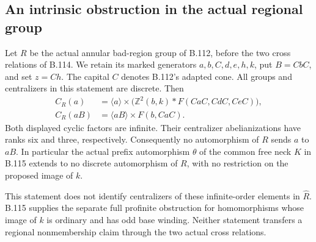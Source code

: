 \subsection*{An intrinsic obstruction in the actual regional group}

\label{stmt:B116}
Let $R$ be the actual annular bad-region group of B.112, before the
two cross relations of B.114. We retain its marked generators
$a,b,C,d,e,h,k$, put $B=CbC$, and set $z=Ch$.
The capital $C$ denotes B.112's adapted cone.
All groups and centralizers in this statement are discrete. Then
\begin{align}
 C_R(a)&=\langle a\rangle\times
   \bigl(\mathbb Z^2(b,k)*F(CaC,CdC,CeC)\bigr),
   \label{eq:B116-centralizer-a}\\
 C_R(aB)&=\langle aB\rangle\times F(b,CaC).
   \label{eq:B116-centralizer-prefix}
\end{align}
Both displayed cyclic factors are infinite. Their centralizer
abelianizations have ranks six and three, respectively. Consequently
no automorphism of $R$ sends $a$ to $aB$. In particular the actual
prefix automorphism $\theta$ of the common free neck $K$ in B.115
extends to no discrete automorphism of $R$, with no restriction on
the proposed image of $k$.

This statement does not identify centralizers of these infinite-order
elements in $\widehat R$. B.115 supplies the separate full profinite
obstruction for homomorphisms whose image of $k$ is ordinary and has
odd base winding. Neither statement transfers a regional nonmembership
claim through the two actual cross relations.

